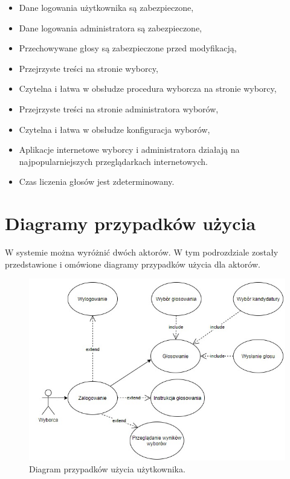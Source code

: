 \documentclass[a4paper,12pt]{book}
\begin{document}
\begin{itemize}
	\item Dane logowania użytkownika są zabezpieczone,
	\item Dane logowania administratora są zabezpieczone,
	\item Przechowywane głosy są zabezpieczone przed modyfikacją,
	\item Przejrzyste treści na stronie wyborcy,
	\item Czytelna i łatwa w obsłudze procedura wyborcza na stronie wyborcy,
	\item Przejrzyste treści na stronie administratora wyborów,
	\item Czytelna i łatwa w obsłudze konfiguracja wyborów,
	\item Aplikacje internetowe wyborcy i administratora działają na najpopularniejszych przeglądarkach internetowych.
	\item Czas liczenia głosów jest zdeterminowany.
\end{itemize}
\newpage

\section{Diagramy przypadków użycia}

W systemie można wyróżnić dwóch aktorów. W tym podrozdziale zostały przedstawione i omówione diagramy przypadków użycia dla aktorów.

\begin{figure}[h]
	\centering
	\includegraphics[width=\textwidth]{images/user_use_case.jpg}
	\caption{Diagram przypadków użycia użytkownika.}
\end {figure}
\end{document}
